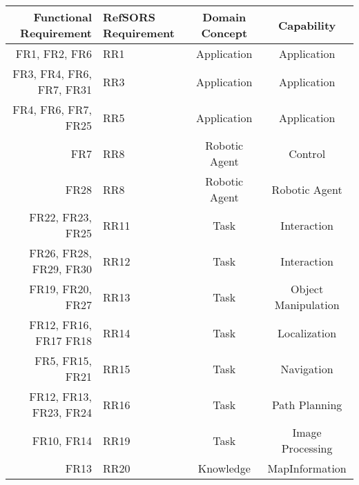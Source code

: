 \begin{table}
	\centering
	\begin{tabular}{| r | p{2cm} | c | c |}
		\hline
		Functional Requirement & RefSORS Requirement & Domain Concept & Capability \\ 
		\hline
		FR1, FR2, FR6 & RR1 & Application & Application \\
		FR3, FR4, FR6, FR7, FR31 & RR3 & Application & Application\\
		FR4, FR6, FR7, FR25 & RR5 & Application & Application\\
		\hline
		FR7 & RR8 & Robotic Agent & Control \\%
		FR28 & RR8 & Robotic Agent & Robotic Agent \\%
		\hline
		FR22, FR23, FR25 & RR11 & Task & Interaction \\
		FR26, FR28, FR29, FR30 & RR12 & Task & Interaction \\
		FR19, FR20, FR27 & RR13 & Task & Object Manipulation\\
		FR12, FR16, FR17 FR18 & RR14 & Task & Localization\\
		FR5, FR15, FR21 & RR15 & Task & Navigation\\
		FR12, FR13, FR23, FR24 & RR16 & Task & Path Planning\\
		FR10, FR14 & RR19 & Task & Image Processing \\ %
		\hline
		FR13 & RR20 & Knowledge & MapInformation \\

\end{tabular}
\end{table}
